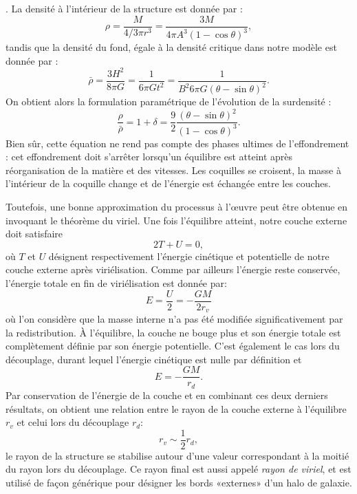 . La densité à l'intérieur de la structure est donnée par :
\begin{equation}
\rho = \frac{M}{4/3 \pi r^3}=\frac{3M}{4\pi A^3(1-\cos \theta)^3}, 
\end{equation}
tandis que la densité du fond, égale à la densité critique dans notre modèle est donnée par :
\begin{equation}
\bar \rho =\frac{3H^2}{8\pi G}=\frac{1}{6\pi G t^2}=\frac{1}{B^2 6\pi G (\theta-\sin \theta)^2}.
\end{equation}
On obtient alors la formulation paramétrique de l'évolution de la surdensité :
\begin{equation}
\frac{\rho}{\bar \rho}=1+\delta=\frac{9}{2}\frac{(\theta - \sin \theta)^2}{(1-\cos \theta)^3}.
\label{e:dcoll}
\end{equation}
Bien sûr, cette équation ne rend pas compte des phases ultimes de l'effondrement : cet effondrement doit s'arrêter lorsqu'un équilibre est atteint après réorganisation de la matière et des vitesses. Les coquilles se croisent, la masse à l'intérieur de la coquille change et de l'énergie est échangée entre les couches.  

Toutefois, une bonne approximation du processus à l'œuvre peut être obtenue en invoquant le théorème du viriel. Une fois l'équilibre atteint, notre couche externe doit satisfaire
\begin{equation}
2 T +U = 0,
\end{equation}
où $T$ et $U$ désignent respectivement l'énergie cinétique et potentielle de notre couche externe après viriélisation. Comme par ailleurs l'énergie reste conservée, l'énergie totale en fin de viriélisation est donnée par:
\begin{equation}
E=\frac{U}{2}=-\frac{GM}{2r_v}
\end{equation}
où l'on considère que la masse interne n'a pas été modifiée significativement par la redistribution. À l'équilibre, la couche ne bouge plus et son énergie totale est complètement définie par son énergie potentielle. C'est également le cas lors du découplage, durant lequel l'énergie cinétique est nulle par définition et 
\begin{equation}
E=-\frac{GM}{r_d}.
\end{equation}
Par conservation de l'énergie de la couche et en combinant ces deux derniers résultats, on obtient une relation entre le rayon de la couche externe à l'équilibre $r_v$ et celui lors du découplage $r_d$:
\begin{equation}
r_v\sim \frac{1}{2}r_d,
\end{equation}
le rayon de la structure se stabilise autour d'une valeur correspondant à la moitié du rayon lors du découplage. Ce rayon final est aussi appelé \textit{rayon de viriel}, et est utilisé de façon générique pour désigner les bords «externes» d'un halo de galaxie.

